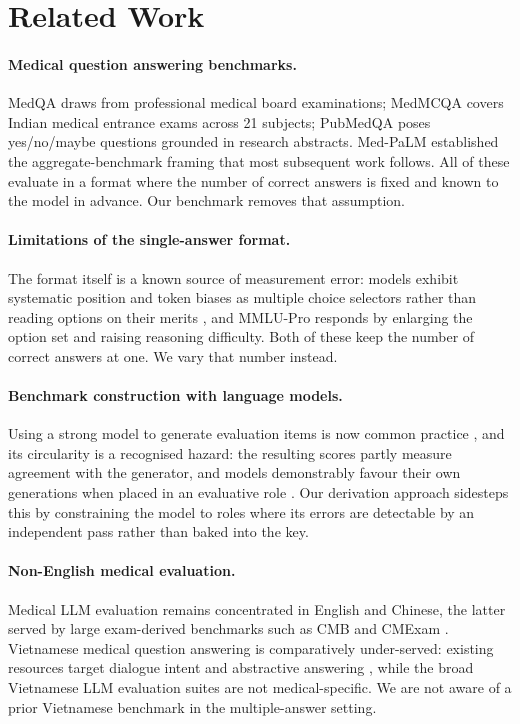 \documentclass{article} %
\begin{document}
\section{Related Work}

\paragraph{Medical question answering benchmarks.} MedQA \citep{jin2021medqa} draws from
professional medical board examinations; MedMCQA \citep{pal2022medmcqa} covers Indian
medical entrance exams across 21 subjects; PubMedQA \citep{jin2019pubmedqa} poses
yes/no/maybe questions grounded in research abstracts. Med-PaLM
\citep{singhal2023clinical} established the aggregate-benchmark framing that most
subsequent work follows. All of these evaluate in a format where the number of correct
answers is fixed and known to the model in advance. Our benchmark removes that
assumption.

\paragraph{Limitations of the single-answer format.} The format itself is a known source
of measurement error: models exhibit systematic position and token biases as multiple
choice selectors rather than reading options on their merits \citep{zheng2024selectors},
and MMLU-Pro \citep{wang2024mmlupro} responds by enlarging the option set and raising
reasoning difficulty. Both of these keep the number of correct answers at one. We vary
that number instead.

\paragraph{Benchmark construction with language models.} Using a strong model to generate
evaluation items is now common practice \citep{wang2023selfinstruct}, and its circularity
is a recognised hazard: the resulting scores partly measure agreement with the generator,
and models demonstrably favour their own generations when placed in an evaluative role
\citep{zheng2023judging,panickssery2024selfpreference}. Our derivation approach sidesteps
this by constraining the model to roles where its errors are detectable by an independent
pass rather than baked into the key.

\paragraph{Non-English medical evaluation.} Medical LLM evaluation remains concentrated
in English and Chinese, the latter served by large exam-derived benchmarks such as CMB
\citep{wang2024cmb} and CMExam \citep{liu2023cmexam}. Vietnamese medical question
answering is comparatively under-served: existing resources target dialogue intent
\citep{huy2021vimq} and abstractive answering \citep{tran2024vimedaqa}, while the broad
Vietnamese LLM evaluation suites \citep{truong2024vietnamese} are not medical-specific.
We are not aware of a prior Vietnamese benchmark in the multiple-answer setting.
\end{document}
